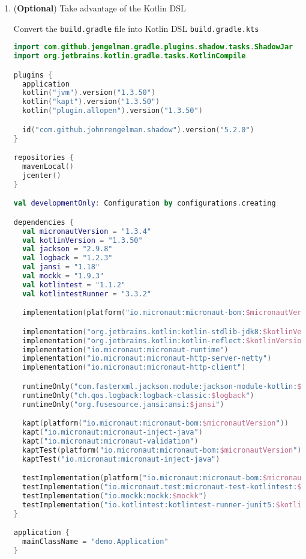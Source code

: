 \begin{enumerate}
\item (\textbf{Optional}) Take advantage of the Kotlin DSL

Convert the \texttt{build.gradle} file into Kotlin DSL \texttt{build.gradle.kts}

\begin{lstlisting}[language=Kotlin]
import com.github.jengelman.gradle.plugins.shadow.tasks.ShadowJar
import org.jetbrains.kotlin.gradle.tasks.KotlinCompile

plugins {
  application
  kotlin("jvm").version("1.3.50")
  kotlin("kapt").version("1.3.50")
  kotlin("plugin.allopen").version("1.3.50")

  id("com.github.johnrengelman.shadow").version("5.2.0")
}

repositories {
  mavenLocal()
  jcenter()
}

val developmentOnly: Configuration by configurations.creating

dependencies {
  val micronautVersion = "1.3.4"
  val kotlinVersion = "1.3.50"
  val jackson = "2.9.8"
  val logback = "1.2.3"
  val jansi = "1.18"
  val mockk = "1.9.3"
  val kotlintest = "1.1.2"
  val kotlintestRunner = "3.3.2"

  implementation(platform("io.micronaut:micronaut-bom:$micronautVersion"))

  implementation("org.jetbrains.kotlin:kotlin-stdlib-jdk8:$kotlinVersion")
  implementation("org.jetbrains.kotlin:kotlin-reflect:$kotlinVersion")
  implementation("io.micronaut:micronaut-runtime")
  implementation("io.micronaut:micronaut-http-server-netty")
  implementation("io.micronaut:micronaut-http-client")

  runtimeOnly("com.fasterxml.jackson.module:jackson-module-kotlin:$jackson")
  runtimeOnly("ch.qos.logback:logback-classic:$logback")
  runtimeOnly("org.fusesource.jansi:ansi:$jansi")

  kapt(platform("io.micronaut:micronaut-bom:$micronautVersion"))
  kapt("io.micronaut:micronaut-inject-java")
  kapt("io.micronaut:micronaut-validation")
  kaptTest(platform("io.micronaut:micronaut-bom:$micronautVersion"))
  kaptTest("io.micronaut:micronaut-inject-java")

  testImplementation(platform("io.micronaut:micronaut-bom:$micronautVersion"))
  testImplementation("io.micronaut.test:micronaut-test-kotlintest:$kotlintest")
  testImplementation("io.mockk:mockk:$mockk")
  testImplementation("io.kotlintest:kotlintest-runner-junit5:$kotlintestRunner")
}

application {
  mainClassName = "demo.Application"
}


\end{lstlisting}
\end{enumerate}
